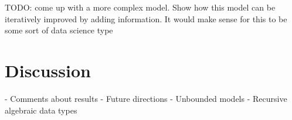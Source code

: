 \documentclass[proceed]{article}
\begin{document}
TODO: come up with a more complex model.  Show how this model can be iteratively improved by adding information.  It would make sense for this to be some sort of data science type  



  \section{Discussion}

  - Comments about results
  - Future directions
    - Unbounded models
    - Recursive algebraic data types
\end{document}
